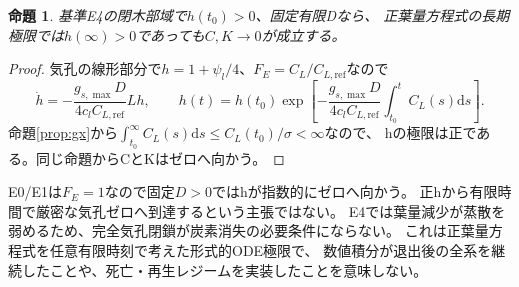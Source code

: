 \documentclass[a4paper,11pt]{ltjsarticle}
\newcommand{\dd}{\mathrm{d}}
\newtheorem{proposition}{命題}[section]
\begin{document}
\begin{proposition}\label{prop:hpositive}
基準E4の閉木部域で$h(t_0)>0$、固定有限Dなら、
正葉量方程式の長期極限では$h(\infty)>0$であっても$C,K\to0$が成立する。
\end{proposition}
\begin{proof}
気孔の線形部分で$h=1+\psi_l/4$、$F_E=C_L/C_{L,\mathrm{ref}}$なので
\begin{equation}
 \dot h=-\frac{g_{s,\max}D}{4c_lC_{L,\mathrm{ref}}}Lh,\qquad
 h(t)=h(t_0)\exp\left[-\frac{g_{s,\max}D}{4c_lC_{L,\mathrm{ref}}}
                                  \int_{t_0}^t C_L(s)\dd s\right].
\end{equation}
命題\ref{prop:gx}から$\int_{t_0}^\infty C_L(s)\dd s\le C_L(t_0)/\sigma<\infty$なので、
hの極限は正である。同じ命題からCとKはゼロへ向かう。
\end{proof}
E0/E1は$F_E=1$なので固定$D>0$ではhが指数的にゼロへ向かう。
正hから有限時間で厳密な気孔ゼロへ到達するという主張ではない。
E4では葉量減少が蒸散を弱めるため、完全気孔閉鎖が炭素消失の必要条件にならない。
これは正葉量方程式を任意有限時刻で考えた形式的ODE極限で、
数値積分が退出後の全系を継続したことや、死亡・再生レジームを実装したことを意味しない。
\end{document}
